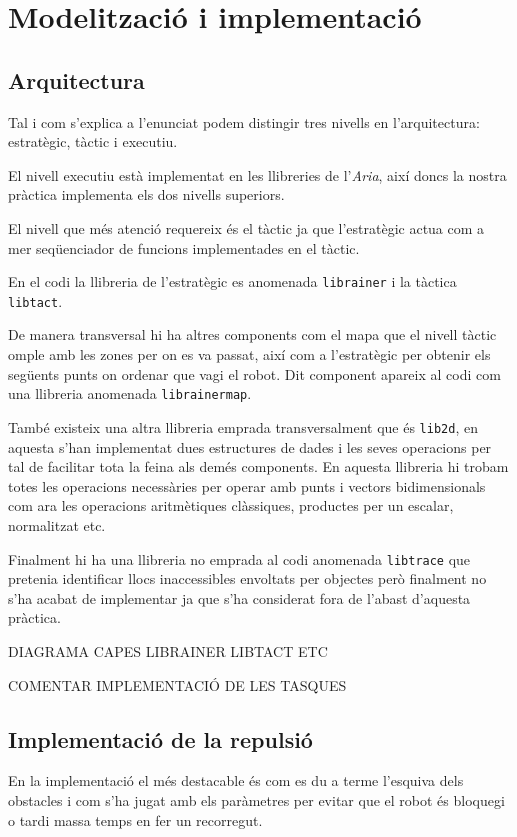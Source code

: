 \section{Modelització i implementació}

\subsection{Arquitectura}
Tal i com s'explica a l'enunciat podem distingir tres nivells en l'arquitectura: estratègic, tàctic i executiu.

El nivell executiu està implementat en les llibreries de l'\emph{Aria}, així doncs la nostra pràctica implementa
els dos nivells superiors.

El nivell que més atenció requereix és el tàctic ja que l'estratègic actua com a mer seqüenciador
de funcions implementades en el tàctic.

En el codi la llibreria de l'estratègic es anomenada \texttt{librainer} i la tàctica \texttt{libtact}.

De manera transversal hi ha altres components com el mapa que el nivell tàctic omple amb les zones
per on es va passat, així com a l'estratègic per obtenir els següents punts on ordenar que vagi el robot.
Dit component apareix al codi com una llibreria anomenada \texttt{librainermap}.

També existeix una altra llibreria emprada transversalment que és \texttt{lib2d}, en aquesta s'han implementat
dues estructures de dades i les seves operacions per tal de facilitar tota la feina als demés components.
En aquesta llibreria hi trobam totes les operacions necessàries per operar amb punts i vectors bidimensionals
com ara les operacions aritmètiques clàssiques, productes per un escalar, normalitzat etc.

Finalment hi ha una llibreria no emprada al codi anomenada \texttt{libtrace} que pretenia identificar llocs
inaccessibles envoltats per objectes però finalment no s'ha acabat de implementar ja que s'ha considerat
fora de l'abast d'aquesta pràctica.

DIAGRAMA CAPES LIBRAINER LIBTACT ETC

COMENTAR IMPLEMENTACIÓ DE LES TASQUES


\subsection{Implementació de la repulsió}

En la implementació el més destacable és com es du a terme l'esquiva dels obstacles i com s'ha jugat amb
els paràmetres per evitar que el robot és bloquegi o tardi massa temps en fer un recorregut. 

